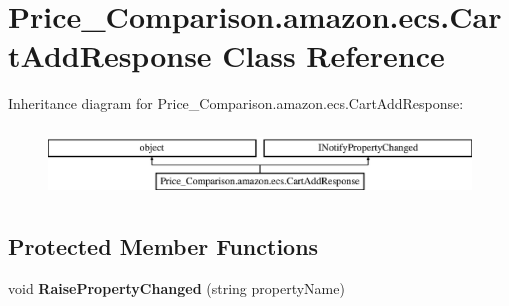 \hypertarget{class_price___comparison_1_1amazon_1_1ecs_1_1_cart_add_response}{\section{Price\-\_\-\-Comparison.\-amazon.\-ecs.\-Cart\-Add\-Response Class Reference}
\label{class_price___comparison_1_1amazon_1_1ecs_1_1_cart_add_response}
}


 


Inheritance diagram for Price\-\_\-\-Comparison.\-amazon.\-ecs.\-Cart\-Add\-Response\-:\begin{figure}[H]
\begin{center}
\leavevmode
\includegraphics[height=1.860465cm]{class_price___comparison_1_1amazon_1_1ecs_1_1_cart_add_response}
\end{center}
\end{figure}
\subsection*{Protected Member Functions}
\begin{DoxyCompactItemize}
\item 
\hypertarget{class_price___comparison_1_1amazon_1_1ecs_1_1_cart_add_response_a1042d5baa1937c9d162b676b866f4164}{void {\bfseries Raise\-Property\-Changed} (string property\-Name)}\label{class_price___comparison_1_1amazon_1_1ecs_1_1_cart_add_response_a1042d5baa1937c9d162b676b866f4164}

\end{DoxyCompactItemize}
